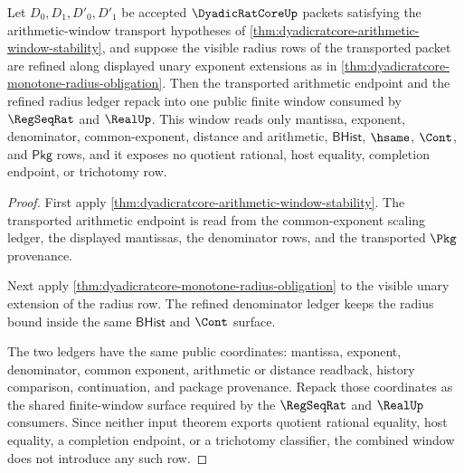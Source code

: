 \begin{theorem}
\label{thm:dyadicratcore-arithmetic-monotone-window-package}
Let $D_0,D_1,D'_0,D'_1$ be accepted $\DyadicRatCoreUp$ packets satisfying
the arithmetic-window transport hypotheses of
\autoref{thm:dyadicratcore-arithmetic-window-stability}, and suppose the
visible radius rows of the transported packet are refined along displayed
unary exponent extensions as in
\autoref{thm:dyadicratcore-monotone-radius-obligation}. Then the transported
arithmetic endpoint and the refined radius ledger repack into one public
finite window consumed by $\RegSeqRat$ and $\RealUp$. This window reads only
mantissa, exponent, denominator, common-exponent, distance and arithmetic,
$\mathsf{BHist}$, $\hsame$, $\Cont$, and $\mathsf{Pkg}$ rows, and it exposes
no quotient rational, host equality, completion endpoint, or trichotomy row.
\end{theorem}
\begin{proof}
First apply \autoref{thm:dyadicratcore-arithmetic-window-stability}. The
transported arithmetic endpoint is read from the common-exponent scaling
ledger, the displayed mantissas, the denominator rows, and the transported
$\Pkg$ provenance.

Next apply \autoref{thm:dyadicratcore-monotone-radius-obligation} to the
visible unary extension of the radius row. The refined denominator ledger
keeps the radius bound inside the same $\mathsf{BHist}$ and $\Cont$ surface.

The two ledgers have the same public coordinates: mantissa, exponent,
denominator, common exponent, arithmetic or distance readback, history
comparison, continuation, and package provenance. Repack those coordinates as
the shared finite-window surface required by the $\RegSeqRat$ and $\RealUp$
consumers. Since neither input theorem exports quotient rational equality,
host equality, a completion endpoint, or a trichotomy classifier, the combined
window does not introduce any such row.
\end{proof}

